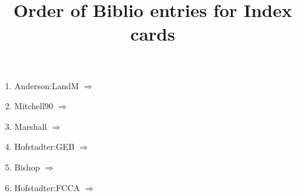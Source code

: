 \documentclass{memoir}
\begin{document}


\title{Order of Biblio entries for Index cards}
\maketitle

\newcommand{\mycite}[1]{#1 $\Rightarrow$ \citet{#1}}

\begin{enumerate}
\item \mycite{Anderson:LandM}
\item \mycite{Mitchell90} 
\item \mycite{Marshall}
\item \mycite{Hofstadter:GEB}
\item \mycite{Bishop}
\item \mycite{Hofstadter:FCCA}
\end{enumerate}



\end{document}
